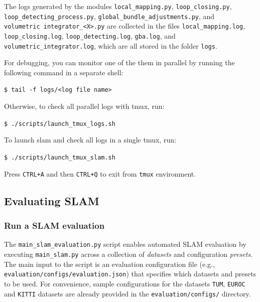 \documentclass{article}
\newenvironment{Shaded}{\begin{snugshade}}{\end{snugshade}}
\newcommand{\BuiltInTok}[1]{\textcolor[rgb]{0.74,0.68,0.62}{#1}}
\newcommand{\ExtensionTok}[1]{\textcolor[rgb]{0.74,0.68,0.62}{#1}}
\newcommand{\NormalTok}[1]{\textcolor[rgb]{0.74,0.68,0.62}{#1}}
\newcommand{\codeline}[1]{\texttt{\NormalTok{\$ }\BuiltInTok{\ExtensionTok{#1}}}}
\newenvironment{codeblock}
{
\begin{scriptsize}
\begin{Shaded}
}
{
\end{Shaded}
\end{scriptsize}
}
\begin{document}
The logs generated by the modules \texttt{local\_mapping.py},
\texttt{loop\_closing.py}, \texttt{loop\_detecting\_process.py},
\texttt{global\_bundle\_adjustments.py}, and
\texttt{volumetric\ integrator\_\textless{}X\textgreater{}.py} are
collected in the files \texttt{local\_mapping.log},
\texttt{loop\_closing.log}, \texttt{loop\_detecting.log},
\texttt{gba.log}, and \texttt{volumetric\_integrator.log}, which are all
stored in the folder \texttt{logs}. 

For debugging, you can monitor one
of the them in parallel by running the following command in a separate
shell:\\
\begin{codeblock}
\codeline{tail\ -f\ logs/\textless{}log\ file\ name\textgreater{}}
\end{codeblock}
Otherwise, to check all parallel logs with tmux, run:\\
\begin{codeblock}
\codeline{./scripts/launch\_tmux\_logs.sh}
\end{codeblock}
To launch slam and check all logs in a single tmux, run:\\
\begin{codeblock}
\codeline{./scripts/launch\_tmux\_slam.sh}
\end{codeblock}
Press \texttt{CTRL+A} and then \texttt{CTRL+Q} to exit from
\texttt{tmux} environment.

\hypertarget{evaluating-slam}{%
\subsection{Evaluating SLAM}\label{evaluating-slam}}

\hypertarget{run-a-slam-evaluation}{%
\subsubsection{Run a SLAM evaluation}\label{run-a-slam-evaluation}}

The \texttt{main\_slam\_evaluation.py} script enables automated SLAM
evaluation by executing \texttt{main\_slam.py} across a collection of
\textit{datasets} and configuration \textit{presets}. The main input to the script is an evaluation configuration file (e.g., \texttt{evaluation/configs/evaluation.json}) that specifies which datasets and presets to be used. For convenience, sample configurations for the datasets \texttt{TUM}, \texttt{EUROC} and \texttt{KITTI} datasets are already provided in the \texttt{evaluation/configs/} directory.
\end{document}

